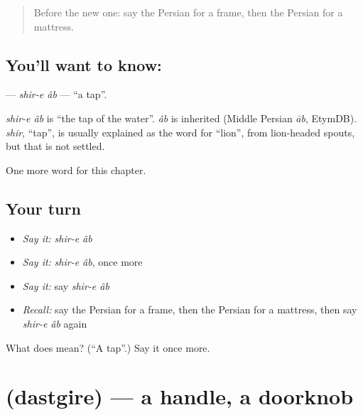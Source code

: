 \label{lesson:FA-C282-shir-e-ab}



\begin{quote}
Before the new one: say the Persian for a frame, then the Persian for a mattress.
\end{quote}

\subsection*{You'll want to know:  }
\textbf{ } — \emph{shir-e âb} — \textquotedblleft{}a tap\textquotedblright{}.

\begin{cousinweb}
\emph{shir-e âb} is \textquotedblleft{}the tap of the water\textquotedblright{}. \emph{âb} is inherited (Middle Persian \emph{āb}, EtymDB). \emph{shir}, \textquotedblleft{}tap\textquotedblright{}, is usually explained as the word for \textquotedblleft{}lion\textquotedblright{}, from lion-headed spouts, but that is not settled.
\end{cousinweb}

\begin{grammarlens}[title={What you've built}]
One more word for this chapter.
\end{grammarlens}

\subsection*{Your turn}
\begin{itemize}
\raggedright
  \item \emph{Say it:} \emph{shir-e âb}
  \item \emph{Say it:} \emph{shir-e âb}, once more
  \item \emph{Say it:} say \emph{shir-e âb}
  \item \emph{Recall:} say the Persian for a frame, then the Persian for a mattress, then say \emph{shir-e âb} again
\end{itemize}

\begin{tcolorbox}[breakable,colback=teal!4,colframe=teal!35!black,title={Before you move on}]
What does   mean? (\textquotedblleft{}A tap\textquotedblright{}.) Say it once more.
\end{tcolorbox}
\section[\texorpdfstring{\fa{دستگیره} (dastgire)}{دستگیره (dastgire)}]{ (dastgire) — a handle, a doorknob}

